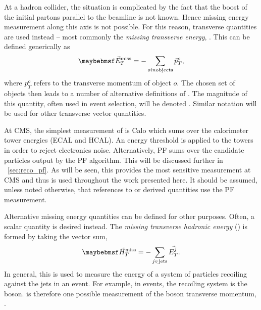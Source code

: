 At a hadron collider, the situation is complicated by the fact that the boost of
the initial partons parallel to the beamline is not known. Hence missing energy
measurement along this axis is not possible. For this reason, transverse
quantities are used instead -- most commonly the \emph{missing transverse
  energy}, \METv. This can be defined generically as
\begin{equation*}
\METv = -\sum_{o in \textrm{objects}} \vec{p}_T^o,
\end{equation*}
where $p_T^o$ refers to the transverse momentum of object $o$. The chosen set of
objects then leads to a number of alternative definitions of \METv. The
magnitude of this quantity, often used in event selection, will be denoted
\MET. Similar notation will be used for other transverse vector quantities.

At \ac{CMS}, the simplest measurement of \METv is \ac{Calo} \METv which sums
over the calorimeter tower energies (\ac{ECAL} and \ac{HCAL}).  An energy
threshold is applied to the towers in order to reject electronics
noise. Alternatively, \ac{PF} \METv sums over the candidate particles output by
the \ac{PF} algorithm. This will be discussed further in
\sec~\ref{sec:reco_pf}. As will be seen, this provides the most sensitive
\METv measurement at \ac{CMS} and thus is used throughout the work presented
here. It should be assumed, unless noted otherwise, that references to \METv or
derived quantities use the \ac{PF} measurement.

Alternative missing energy quantities can be defined for other purposes. Often,
a scalar quantity is desired instead. The \emph{missing transverse hadronic
  energy} (\MHT) is formed by taking the vector sum,
\begin{equation*}
\MHTv = -\sum_{j \in \textrm{jets}} \vec{E_T^j}.
\end{equation*}
In general, this is used to measure the energy of a system of particles
recoiling against the jets in an event. For example, in \Wjets events, the
recoiling system is the \PW boson. \MHTv is therefore one possible measurement
of the \PW boson transverse momentum, \PtWv.


